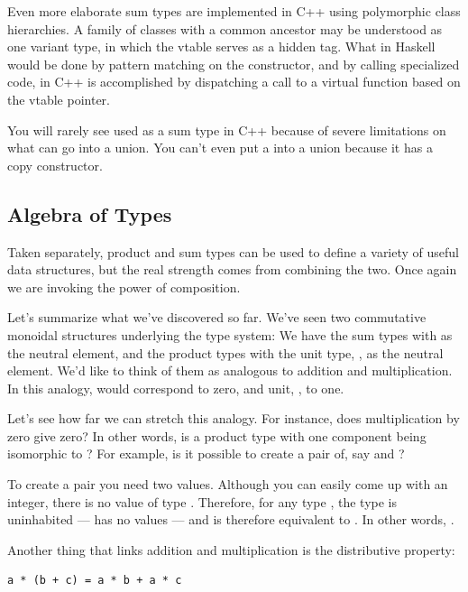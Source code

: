Even more elaborate sum types are implemented in C++ using polymorphic
class hierarchies. A family of classes with a common ancestor may be
understood as one variant type, in which the vtable serves as a hidden
tag. What in Haskell would be done by pattern matching on the
constructor, and by calling specialized code, in C++ is accomplished by
dispatching a call to a virtual function based on the vtable pointer.

You will rarely see  used as a sum type in C++ because of
severe limitations on what can go into a union. You can't even put a
 into a union because it has a copy constructor.

\subsection{Algebra of Types}\label{algebra-of-types}

Taken separately, product and sum types can be used to define a variety
of useful data structures, but the real strength comes from combining
the two. Once again we are invoking the power of composition.

Let's summarize what we've discovered so far. We've seen two commutative
monoidal structures underlying the type system: We have the sum types
with  as the neutral element, and the product types with
the unit type, \code{()}, as the neutral element. We'd like to think
of them as analogous to addition and multiplication. In this analogy,
 would correspond to zero, and unit, \code{()}, to one.

Let's see how far we can stretch this analogy. For instance, does
multiplication by zero give zero? In other words, is a product type with
one component being  isomorphic to ? For
example, is it possible to create a pair of, say  and
?

To create a pair you need two values. Although you can easily come up
with an integer, there is no value of type . Therefore, for
any type , the type  is uninhabited --- has
no values --- and is therefore equivalent to . In other
words, .

Another thing that links addition and multiplication is the distributive
property:

\begin{verbatim}
a * (b + c) = a * b + a * c
\end{verbatim}

